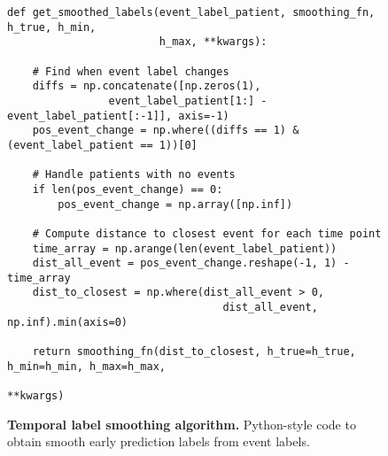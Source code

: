 \documentclass[nohyperref]{article}
\begin{document}
\begin{figure}[hbtp]
\begin{lstlisting}
def get_smoothed_labels(event_label_patient, smoothing_fn, h_true, h_min,
                        h_max, **kwargs):
                        
    # Find when event label changes
    diffs = np.concatenate([np.zeros(1), 
                event_label_patient[1:] - event_label_patient[:-1]], axis=-1)
    pos_event_change = np.where((diffs == 1) & (event_label_patient == 1))[0]
    
    # Handle patients with no events
    if len(pos_event_change) == 0: 
        pos_event_change = np.array([np.inf])

    # Compute distance to closest event for each time point
    time_array = np.arange(len(event_label_patient))
    dist_all_event = pos_event_change.reshape(-1, 1) - time_array
    dist_to_closest = np.where(dist_all_event > 0,
                                  dist_all_event, np.inf).min(axis=0)

    return smoothing_fn(dist_to_closest, h_true=h_true, h_min=h_min, h_max=h_max,
                                                                    **kwargs)
\end{lstlisting}
\caption{\textbf{Temporal label smoothing algorithm.} Python-style code to obtain smooth early prediction labels from event labels.}
\label{fig:code_snippet}
\end{figure}
\begin{comment}
\begin{lstlisting}
        def q_exp(dt, h_true, h_min, h_max, delta_h, gamma):
    """Returns q(t) for alpha_exp.
    
    dt: (int) distance to next event in steps.
    h_true: (int) true horizon of prediction in steps.
    h_min: (int) minimum horizon to apply smoothing in steps.
    h_max: (int) maximum horizon to apply smoothing in steps.
    delta_h: (int) number of steps per hour.

    """
    if dt <= h_min:
        return 1
    elif dt > h_max:
        return 0
    else:
        h_min_scaled = h_min / delta_h
        h_max_scaled = h_max / delta_h
        dt_scaled = dt / delta_h

        d = -(1 / gamma) * np.log(np.exp(-gamma * (h_min_scaled)) - np.exp(-gamma * (h_max_scaled)))
        A = -np.exp(-gamma * (h_max_scaled - d))
        return np.exp(-gamma * (dt_scaled - d)) + A
\end{lstlisting}
\end{comment}
\end{document}
